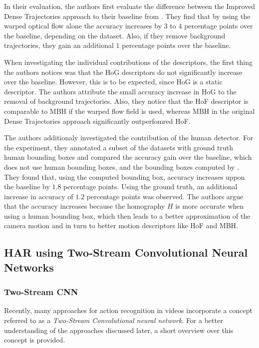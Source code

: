 In their evaluation, the authors first evaluate the difference between the Improved Dense Trajectories approach to their baseline from \cite{wang_dense_2013}.
They find that by using the warped optical flow alone the accuracy increases by $3$ to $4$ percentage points over the baseline, depending on the dataset.
Also, if they remove background trajectories, they gain an additional $1$ percentage points over the baseline.

When investigating the individual contributions of the descriptors, the first thing the authors notices was that the HoG descriptors do not significantly increase over the baseline.
However, this is to be expected, since HoG is a static descriptor.
The authors attribute the small accuracy increase in HoG to the removal of background trajectories.
Also, they notice that the HoF descriptor is comparable to MBH if the warped flow field is used, whereas MBH in the original Dense Trajectories approach significantly outperfomred HoF.

The authors additionaly investigated the contribution of the human detector.
For the experiment, they annotated a subset of the datasets with ground truth human bounding boxes and compared the accuracy gain over the baseline, which does not use human bounding boxes, and the bounding boxes computed by \cite{prest_weakly_2012}.
They found that, using the computed bounding box, accuracy increases uppon the baseline by $1.8$ percentage points.
Using the ground truth, an additional increase in accuracy of $1.2$ percentage points was observed.
The authors argue that the accuracy increases because the homography $H$ is more accurate when using a human bounding box, which then leads to a better approximation of the camera motion and in turn to better motion descriptors like HoF and MBH.

\subsection{HAR using Two-Stream Convolutional Neural Networks}
\subsubsection{Two-Stream CNN}
\label{sec:two-stream}
Recently, many approaches for action recognition in videos incorporate a concept referred to as a \textit{Two-Stream Convolutional neural network}.
For a better understanding of the approaches discussed later, a short overview over this concept is provided.


